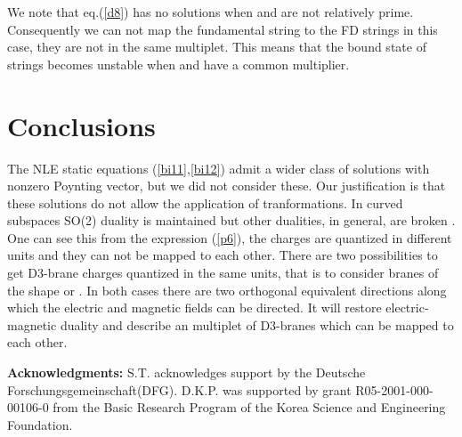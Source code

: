 \documentclass[a4paper,12pt]{article}
\begin{document}
\noindent

We note that eq.(\ref{d8}) has no solutions when \coordHE{} and \coordHE{} are not 
relatively prime. Consequently we can not map the fundamental string to the 
FD strings in this case, they are not in the same \coordHE{} 
multiplet. This means that the bound state of strings becomes unstable when 
\coordHE{} and \coordHE{} have a common multiplier.   

\section{Conclusions}

\noindent

The NLE static equations (\ref{bi11},\ref{bi12}) admit a wider class of 
solutions 
with nonzero Poynting vector, but we did not consider these. Our justification 
is that these solutions do not allow the application of \coordHE{} 
tranformations. In curved subspaces SO(2) duality is maintained but other 
dualities, 
in general, are broken \cite{4}. One can see this from the expression 
(\ref{p6}), the charges are quantized in different units and they can not
be mapped to each other. There are two possibilities to get D3-brane charges 
quantized in the same units, that is to consider branes of the shape 
\coordHE{} or
\coordHE{}. In both cases there are 
two orthogonal equivalent directions along which the electric and magnetic 
fields can be directed. It will restore \coordHE{} electric-magnetic 
duality and describe an \coordHE{} multiplet of D3-branes which can be 
mapped to each other.

\smallskip

{\bf Acknowledgments:}
\newline
S.T. acknowledges support by the Deutsche Forschungsgemeinschaft(DFG).
D.K.P. was supported by grant R05-2001-000-00106-0 from the Basic Research 
Program of the Korea Science and Engineering Foundation.
\end{document}

